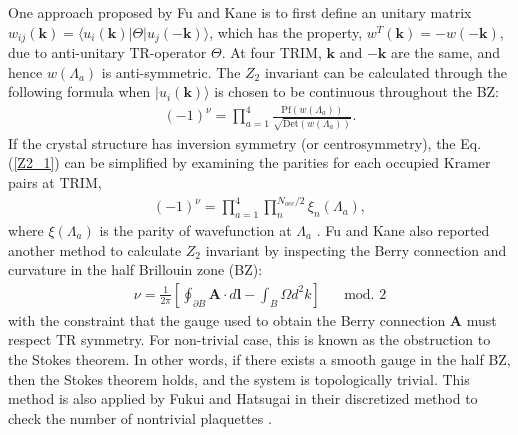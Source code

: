 One approach proposed by Fu and Kane \cite{fu2006time} is to first define an unitary matrix $w_{ij} (\textbf{k}) = \langle u_i(\textbf{k}) | \Theta | u_j(-\textbf{k}) \rangle$, which has the property, $w^T (\textbf{k}) = -w (-\textbf{k}) $, due to anti-unitary TR-operator $\Theta$. At four TRIM, $\textbf{k}$ and $-\textbf{k} $ are the same, and hence $w(\Lambda_a)$ is anti-symmetric. The $Z_2$ invariant can be calculated through the following formula when $| u_i(\textbf{k}) \rangle$ is chosen to be continuous throughout the BZ:
	\begin{equation}
		\label{Z2_1}
		\begin{aligned}
			(-1)^{\nu} = 
			\prod_{a=1}^{4}  \frac{ \text{Pf} (w(\Lambda_a) ) }{ \sqrt{\text{Det}( w(\Lambda_a) )} }.
		\end{aligned}
	\end{equation}
If the crystal structure has inversion symmetry (or centrosymmetry), the Eq. (\ref{Z2_1}) can be simplified by examining the parities for each occupied Kramer pairs at TRIM,
	\begin{equation}
		\label{Z2_2}
		\begin{aligned}
			(-1)^{\nu} = 
			\prod_{a=1}^{4} \prod_{n}^{N_{occ}/2}  \xi_{n}(\Lambda_a),
		\end{aligned}
	\end{equation}
where $\xi(\Lambda_a)$ is the parity of wavefunction at $\Lambda_a$ \cite{fu2007topological}.
Fu and Kane also reported another method \cite{fu2006time} to calculate $Z_2$ invariant by inspecting the Berry connection and curvature in the half Brillouin zone (BZ):
	\begin{equation}
		\begin{aligned}
			\nu = \frac{1}{2 \pi} \left[ \oint_{\partial B} \textbf{A} \cdot d\textbf{l} - \int_B \Omega d^2k \right] \hspace{20pt}  \text{mod. 2}
		\end{aligned}
	\end{equation}
with the constraint that the gauge used to obtain the Berry connection
{\bf A} must respect TR symmetry. For non-trivial case, this is known as the obstruction to the Stokes theorem. In other words, if there exists a smooth gauge in the half BZ, then the Stokes theorem holds, and the system is topologically trivial. This method is also applied by Fukui and Hatsugai in their discretized method to check the number of nontrivial plaquettes \cite{fukui2007quantum}.


